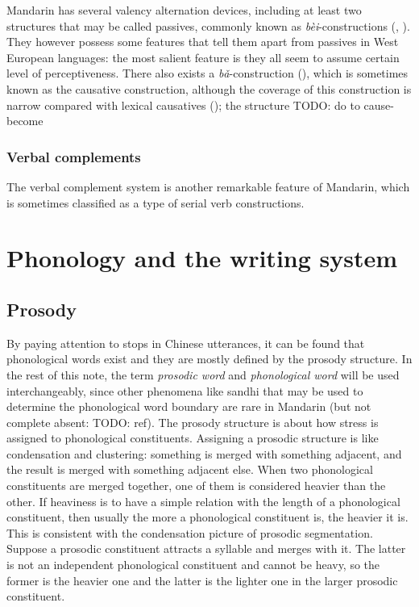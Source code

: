 \documentclass[UTF8, a4paper, oneside, scheme=plain, 12pt]{ctexrep}
\newcommand*{\term}[1]{\emph{#1}}
\newcommand{\form}[1]{\emph{#1}}
\begin{document}
Mandarin has several valency alternation devices, 
including at least two structures 
that may be called passives,
commonly known as \form{bèi}-constructions
(,
).
They however possess some features that tell them apart 
from passives in West European languages:
the most salient feature is 
they all seem to assume certain level of perceptiveness.
There also exists a \form{bǎ}-construction 
(),
which is sometimes known as the causative construction,
although the coverage of this construction 
is narrow compared with lexical causatives ();
the structure TODO: do to cause-become 



\subsection{Verbal complements}

The verbal complement system is another remarkable feature of Mandarin, 
which is sometimes classified as a type of serial verb constructions.


\chapter{Phonology and the writing system}

\section{Prosody}\label{sec:prosody-structure}

By paying attention to stops in Chinese utterances,
it can be found that phonological words exist and they are mostly defined by the prosody structure.
In the rest of this note,
the term \term{prosodic word} and \term{phonological word}
will be used interchangeably, 
since other phenomena like sandhi that may be used to 
determine the phonological word boundary 
are rare in Mandarin 
(but not complete absent: TODO: ref).
The prosody structure is about how stress is assigned to phonological constituents.
Assigning a prosodic structure is like condensation and clustering:
something is merged with something adjacent,
and the result is merged with something adjacent else.
When two phonological constituents are merged together,
one of them is considered heavier than the other.
If heaviness is to have a simple relation with the length of a phonological constituent,
then usually the more a phonological constituent is,
the heavier it is.
This is consistent with the condensation picture of prosodic segmentation.
Suppose a prosodic constituent attracts a syllable and merges with it.
The latter is not an independent phonological constituent
and cannot be heavy,
so the former is the heavier one and the latter is the lighter one in the larger prosodic constituent.
\end{document}
